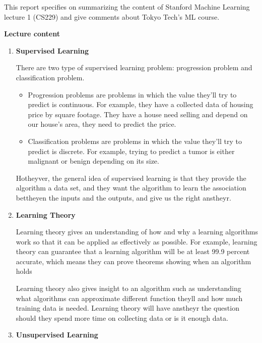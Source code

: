 \documentclass[12pt,twoside]{article}
\newcommand{\releasedate}{August 1st, 2016}
\begin{document}
\handout{Assignment 2}{\releasedate}

\newif\ifsolution
\solutiontrue
\begin{center}
This report specifies on summarizing the content of Stanford Machine Learning lecture 1 (CS229) and
give comments about Tokyo Tech's ML course.\\

\vspace{2em}

\textbf{Lecture content}

\end{center}
\begin{enumerate}
\item \textbf{Supervised Learning}

There are two type of supervised learning problem: progression problem and classification problem.
\begin{itemize}
\item Progression problems are problems in which the value they'll try to predict is continuous. For example, they have a collected data of housing price by square footage. They have a house need selling and depend on our house's area, they need to predict the price.
\item Classification problems are problems in which the value
they'll try to predict is discrete. For example, trying to predict a tumor is either malignant or benign depending on its size.  
\end{itemize}
Hotheyver, the general idea of supervised learning is that they provide the algorithm a data set, and they want the algorithm to learn the association bettheyen the inputs and the outputs, and give us the right anstheyr.
\item \textbf{Learning Theory}

Learning theory gives an understanding of how and why a learning algorithms work so that it can be applied as effectively as possible. For example, learning theory can guarantee that a learning algorithm will be at least 99.9 percent accurate, which means they can prove theorems showing when an algorithm holds

Learning theory also gives insight to an algorithm such as understanding what algorithms can approximate different function theyll and how much training data is needed. Learning theory will have anstheyr the question should they spend more time on collecting data or is it enough data.

\item \textbf{Unsupervised Learning}


\end{enumerate}
\end{document}
